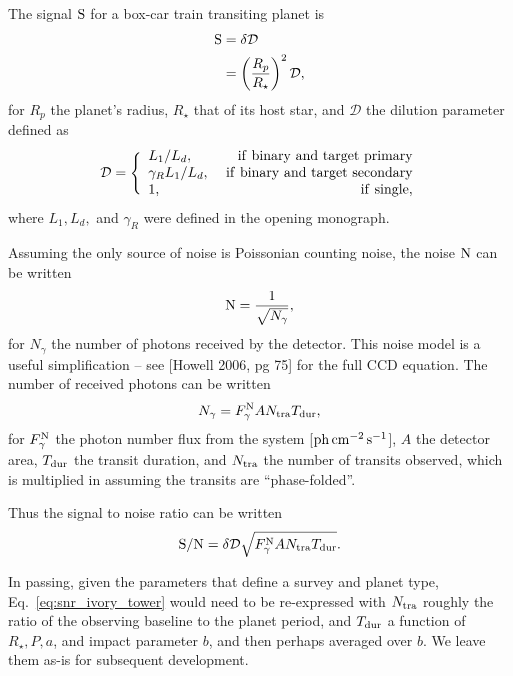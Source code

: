 \documentclass{emulateapj}
\begin{document}
The signal ${\rm S}$ for a box-car train transiting planet is
\begin{align}
{\rm S} &= \delta \mathcal{D} \\
&= \left(\frac{R_p}{R_\star}\right)^2 \mathcal{D},
\end{align}
for $R_p$ the planet's radius, $R_\star$ that of its host star, and 
$\mathcal{D}$ the dilution parameter defined as
\begin{equation}
\mathcal{D} = 
\Bigg\{\begin{array}{lr}
L_1 / L_d, & {\rm\ if\ binary\ and\ target\ primary}\\
\gamma_R L_1 / L_d, & {\rm\ if\ binary\ and\ target\ 
	secondary}\\
1, & {\rm\ if\ single},
\end{array}
\label{eq:dilution}
\end{equation}
where $L_1, L_d,$ and $\gamma_R$ were defined in the opening monograph.

Assuming the only source of noise is Poissonian counting noise, the noise ${\rm 
	N}$ can be written
\begin{equation}
{\rm N} = \frac{1}{\sqrt{N_\gamma}},
\end{equation}
for $N_\gamma$ the number of photons received by the detector. This noise model 
is a useful simplification -- see [Howell 2006, pg 75] for the full 
CCD equation.
The number of received photons can be written
\begin{equation}
N_\gamma = F^{\rm N}_\gamma A N_{\rm tra} T_{\rm dur},
\end{equation}
for $F^{\rm N}_\gamma$ the photon number flux from the system [${\rm 
	ph\,cm^{-2}\,s^{-1}}$], 
$A$ the detector area, $T_{\rm dur}$ the transit duration, and $N_{\rm tra} $ 
the number of transits observed, which is multiplied in assuming the transits 
are ``phase-folded''.

Thus the signal to noise ratio can be written
\begin{equation}
{\rm S/N} = \delta \mathcal{D} \sqrt{F^{\rm N}_\gamma A N_{\rm tra} T_{\rm 
		dur}}.
\label{eq:snr_ivory_tower}
\end{equation}

In passing, given the parameters that define a survey and planet type, 
Eq.~\ref{eq:snr_ivory_tower} would need to be re-expressed with 
$N_{\rm tra}$ roughly the ratio of the observing baseline to the planet period, 
and $T_{\rm dur}$ a function of $R_\star, P, a$, and impact parameter $b$, and 
then perhaps averaged over $b$. We leave them as-is for subsequent 
development.
\end{document}

